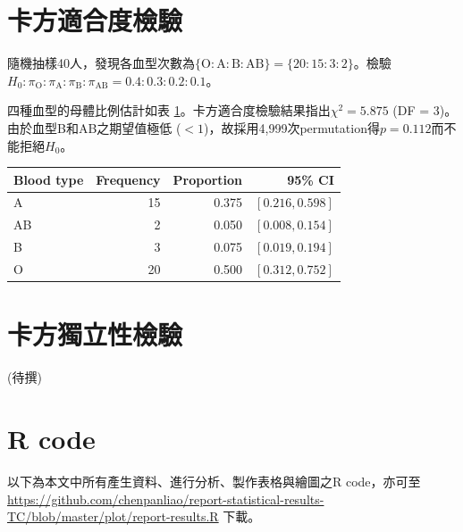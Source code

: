 \documentclass[12pt, a4paper, onecolumn]{article}
\begin{document}
\section{卡方適合度檢驗}
隨機抽樣40人，發現各血型次數為$\{\text{O} : \text{A} : \text{B} : \text{AB}\} = \{20:15:3:2\}$。檢驗$H_0: \pi_{\mathrm{O}} : \pi_{\mathrm{A}} : \pi_{\mathrm{B}} : \pi_{\mathrm{AB}} = 0.4:0.3:0.2:0.1$。

四種血型的母體比例估計如表 \ref{table:chisq_goodness}。卡方適合度檢驗結果指出$\chi^2 = 5.875$ (DF = 3)。由於血型B和AB之期望值極低 ($<1$)，故採用4,999次permutation得$p = 0.112$而不能拒絕$H_0$。

\begin{table}[htb]
	\centering
	\begin{tabular}{lrrr}
		\hline
		Blood type & Frequency & Proportion & 95\% CI \\ 
		\hline
		A & 15 & 0.375 & $\left[0.216, 0.598\right]$ \\ 
		AB & 2 & 0.050 & $\left[0.008, 0.154\right]$ \\ 
		B & 3 & 0.075 & $\left[0.019, 0.194\right]$ \\ 
		O & 20 & 0.500 & $\left[0.312, 0.752\right]$ \\ 
		\hline
	\end{tabular}
	\label{table:chisq_goodness}
\end{table}


\section{卡方獨立性檢驗}
(待撰)

\appendix
\section{R code}
以下為本文中所有產生資料、進行分析、製作表格與繪圖之R code，亦可至 \url{https://github.com/chenpanliao/report-statistical-results-TC/blob/master/plot/report-results.R} 下載。
\end{document}
